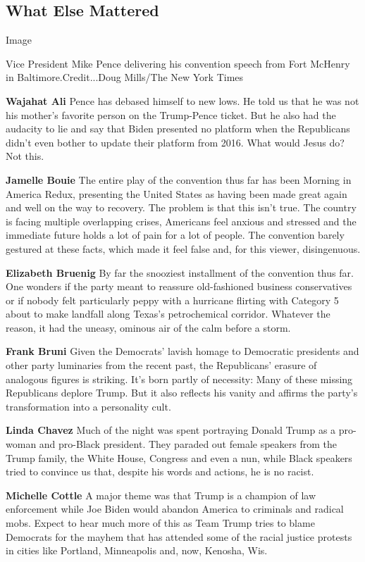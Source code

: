 \hypertarget{what-else-mattered}{%
\subsection{What Else Mattered}\label{what-else-mattered}}

Image

Vice President Mike Pence delivering his convention speech from Fort
McHenry in Baltimore.Credit...Doug Mills/The New York Times

\textbf{Wajahat Ali} Pence has debased himself to new lows. He told us
that he was not his mother's favorite person on the Trump-Pence ticket.
But he also had the audacity to lie and say that Biden presented no
platform when the Republicans didn't even bother to update their
platform from 2016. What would Jesus do? Not this.

\textbf{Jamelle Bouie} The entire play of the convention thus far has
been Morning in America Redux, presenting the United States as having
been made great again and well on the way to recovery. The problem is
that this isn't true. The country is facing multiple overlapping crises,
Americans feel anxious and stressed and the immediate future holds a lot
of pain for a lot of people. The convention barely gestured at these
facts, which made it feel false and, for this viewer, disingenuous.

\textbf{Elizabeth Bruenig} By far the snooziest installment of the
convention thus far. One wonders if the party meant to reassure
old-fashioned business conservatives or if nobody felt particularly
peppy with a hurricane flirting with Category 5 about to make landfall
along Texas's petrochemical corridor. Whatever the reason, it had the
uneasy, ominous air of the calm before a storm.

\textbf{Frank Bruni} Given the Democrats' lavish homage to Democratic
presidents and other party luminaries from the recent past, the
Republicans' erasure of analogous figures is striking. It's born partly
of necessity: Many of these missing Republicans deplore Trump. But it
also reflects his vanity and affirms the party's transformation into a
personality cult.

\textbf{Linda Chavez} Much of the night was spent portraying Donald
Trump as a pro-woman and pro-Black president. They paraded out female
speakers from the Trump family, the White House, Congress and even a
nun, while Black speakers tried to convince us that, despite his words
and actions, he is no racist.

\textbf{Michelle Cottle} A major theme was that Trump is a champion of
law enforcement while Joe Biden would abandon America to criminals and
radical mobs. Expect to hear much more of this as Team Trump tries to
blame Democrats for the mayhem that has attended some of the racial
justice protests in cities like Portland, Minneapolis and, now, Kenosha,
Wis.

